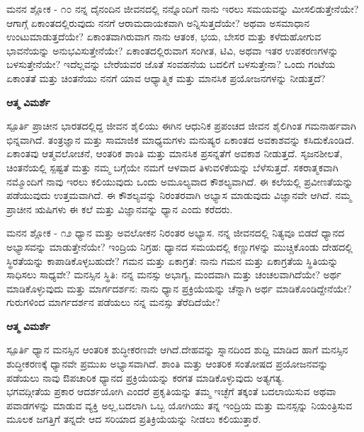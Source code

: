 \newpage
\begin{mananam}{\mananamfont \large{ಮನನ ಶ್ಲೋಕ - ೧೦}}
\mananamtext ನನ್ನ ದೈನಂದಿನ ಜೀವನದಲ್ಲಿ ನನ್ನೊಂದಿಗೆ ನಾನು ಇರಲು ಸಮಯವನ್ನು ಮೀಸಲಿಡುತ್ತೇನೆಯೇ? ಆಗಾಗ್ಗೆ  ಏಕಾಂತದಲ್ಲಿರುವುದು ನನಗೆ ಆರಾಮದಾಯಕವಾಗಿ ಅನ್ನಿಸುತ್ತದೆಯೇ? ಅಥವಾ ಅಸಮಾಧಾನ ಉಂಟುಮಾಡುತ್ತದೆಯೇ? ಏಕಾಂತವಾಗಿರುವಾಗ ನಾನು ಆತಂಕ, ಭಯ, ಬೇಸರ ಮತ್ತು ಕಳೆದುಹೋಗುವ ಭಾವನೆಯನ್ನು ಅನುಭವಿಸುತ್ತೇನೆಯೇ? ಏಕಾಂತದಲ್ಲಿರುವಾಗ ಸಂಗೀತ, ಟಿವಿ, ಅಥವಾ ಇತರ ಉಪಕರಣಗಳನ್ನು ಬಳಸುತ್ತೇನೆಯೇ? ಇದೆಲ್ಲವನ್ನು ಬೇರೆಯವರ ಜೊತೆ ಸಂವಹನೆಯ ಬದಲಿಗೆ ಬಳಸುತ್ತೇನಾ? ಒಂದು ಗಂಟೆಯ ಏಕಾಂತತೆ ಮತ್ತು ಚಿಂತನೆಯು ನನಗೆ ಯಾವ ಆಧ್ಯಾತ್ಮಿಕ ಮತ್ತು ಮಾನಸಿಕ ಪ್ರಯೋಜನಗಳನ್ನು ನೀಡುತ್ತದೆ?
\end{mananam}
\WritingHand\enspace\textbf{ಆತ್ಮ ವಿಮರ್ಶೆ}\\
\begin{inspiration}{\mananamfont \large ಸ್ಪೂರ್ತಿ}
\small \mananamtext ಪ್ರಾಚೀನ ಭಾರತದಲ್ಲಿದ್ದ ಜೀವನ ಶೈಲಿಯು ಈಗಿನ ಆಧುನಿಕ ಪ್ರಪಂಚದ ಜೀವನ ಶೈಲಿಗಿಂತ ಗಮನಾರ್ಹವಾಗಿ ಭಿನ್ನವಾಗಿದೆ. ತಂತ್ರಜ್ಞಾನ ಮತ್ತು ಸಾಮಾಜಿಕ  ಮಾಧ್ಯಮಗಳು ಮನುಷ್ಯರ ಏಕಾಂತದ ಅವಕಾಶವನ್ನು ಕಸಿದುಕೊಂಡಿದೆ. ಏಕಾಂತವು ಆತ್ಮವಲೋಚನೆ, ಆಂತರಿಕ ಶಾಂತಿ ಮತ್ತು ಮಾನಸಿಕ ಪ್ರಸನ್ನತೆಗೆ ಅವಕಾಶ ನೀಡುತ್ತದೆ. ಸೃಜನಶೀಲತೆ, ಚಿಂತನೆಯಲ್ಲಿ ಸ್ಪಷ್ಟತೆ ಮತ್ತು ನಮ್ಮ ಬಗ್ಗೆಯೇ ನಮಗೆ ಆಳವಾದ ತಿಳುವಳಿಕೆಯನ್ನು ಬೆಳೆಸುತ್ತದೆ. ಸಕರಾತ್ಮಕವಾಗಿ  ನಮ್ಮೊಂದಿಗೆ ನಾವು ಇರಲು ಕಲಿಯುವುದು ಒಂದು ಅಮೂಲ್ಯವಾದ ಕೌಶಲ್ಯವಾಗಿದೆ. ಈ ಕಲೆಯಲ್ಲಿ ಪ್ರವೀಣತೆಯನ್ನು ಪಡೆಯುವುದು ಉತ್ತಮವಾಗಿದೆ. ಈ ಕೌಶಲ್ಯವನ್ನು ನಿರಂತರವಾಗಿ ಅಭ್ಯಾಸ ಮಾಡುವುದು ವಿಜ್ಞಾನವೇ ಆಗಿದೆ. ನಮ್ಮ ಪ್ರಾಚೀನ ಋಷಿಗಳು ಈ ಕಲೆ ಮತ್ತು ವಿಜ್ಞಾನವನ್ನು ಧ್ಯಾನ ಎಂದು ಕರೆದರು.
\end{inspiration}
\newpage

\newpage
\begin{mananam}{\mananamfont \large{ಮನನ ಶ್ಲೋಕ - ೧೨}}
\mananamtext ಧ್ಯಾನ ಮತ್ತು ಅವಲೋಕನ ನಿರಂತರ ಅಭ್ಯಾಸ. ನನ್ನ ಜೀವನದಲ್ಲಿ ನಿತ್ಯವೂ ಬಿಡದೆ ಧ್ಯಾನದ ಅಭ್ಯಾಸವನ್ನು ಮಾಡುತ್ತೇನೆಯೇ? ಇಂದ್ರಿಯ ನಿಗ್ರಹ: ಧ್ಯಾನದ ಸಮಯದಲ್ಲಿ ಕಣ್ಣುಗಳನ್ನು ಮುಚ್ಚಿಕೊಂಡು ದೇಹದಲ್ಲಿ ಸ್ಥಿರತೆಯನ್ನು ಕಾಪಾಡಿಕೊಳ್ಳಬಹುದೇ? ಗಮನ ಮತ್ತು ಏಕಾಗ್ರತೆ: ನಾನು ಗಮನ ಮತ್ತು ಏಕಾಗ್ರತೆಯ ಸ್ಥಿತಿಯನ್ನು ಸಾಧಿಸಲು ಸಾಧ್ಯವೇ?  ಮನಸ್ಸಿನ ಸ್ಥಿತಿ: ನನ್ನ ಮನಸ್ಸು ಅಭಾಗ್ಯ, ಮಂದವಾಗಿ ಮತ್ತು ಚಂಚಲವಾಗಿದೆಯೇ? ಅರ್ಥ ಮಾಡಿಕೊಳ್ಳುವುದು ಮತ್ತು ಮಾರ್ಗದರ್ಶನ: ನಾನು ಧ್ಯಾನ ಪ್ರಕ್ರಿಯೆಯನ್ನು ಚೆನ್ನಾಗಿ ಅರ್ಥ ಮಾಡಿಕೊಂಡಿದ್ದೇನೆಯೇ? ಗುರುಗಳಿಂದ ಮಾರ್ಗದರ್ಶನ ಪಡೆಯಲು ನನ್ನ ಮನಸ್ಸು ತೆರೆದಿದೆಯೇ?
\end{mananam}
\WritingHand\enspace\textbf{ಆತ್ಮ ವಿಮರ್ಶೆ}\\
\begin{inspiration}{\mananamfont \large ಸ್ಪೂರ್ತಿ}
\mananamtext ಧ್ಯಾನ ಮನಸ್ಸಿನ ಆಂತರಿಕ ಶುದ್ಧೀಕರಣವೇ ಆಗಿದೆ.ದೇಹವನ್ನು ಸ್ನಾನದಿಂದ ಶುದ್ದಿ ಮಾಡಿದ ಹಾಗೆ ಮನಸ್ಸಿನ ಶುದ್ಧೀಕರಣಕ್ಕೆ ಧ್ಯಾನವೇ ಪ್ರಮುಖ ಅಭ್ಯಾಸವಾಗಿದೆ. ಶಾಂತಿ ಮತ್ತು ಆಂತರಿಕ ಸಂತೋಷದ  ಪ್ರಯೋಜನವನ್ನು ಪಡೆಯಲು ನಾವು ಔಪಚಾರಿಕ ಧ್ಯಾನದ ಪ್ರಕ್ರಿಯೆಯನ್ನು ಕರಗತ ಮಾಡಿಕೊಳ್ಳುವುದು ಅತ್ಯಗತ್ಯ.\\
ಭಗವದ್ಗೀತೆಯ ಪ್ರಕಾರ ಆದರ್ಶಯೋಗಿ ಎಂದರೆ ಪ್ರಕೃತಿಯನ್ನು ತಮ್ಮ ಇಚ್ಛೆಗೆ ತಕ್ಕಂತೆ ಬದಲಾಯಿಸುವ ಅಥವಾ ಪವಾಡಗಳನ್ನು ಮಾಡುವ ವ್ಯಕ್ತಿ ಅಲ್ಲ,ಬದಲಾಗಿ ಒಬ್ಬ ಯೋಗಿಯು ತನ್ನ ಇಂದ್ರಿಯ ಮತ್ತು ಮನಸ್ಸನ್ನು ನಿಯಂತ್ರಿಸುವ ಮೂಲಕ ಜಗತ್ತಿಗೆ ತನ್ನದೇ ಆದ ಸರಿಯಾದ ಪ್ರತಿಕ್ರಿಯೆಯನ್ನು ನೀಡಲು ಕಲಿಯುತ್ತಾರೆ.
\end{inspiration}
\newpage


